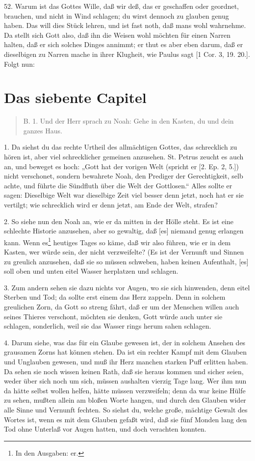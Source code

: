 52. Warum ist das Gottes Wille, daß wir deß, das er geschaffen oder geordnet, brauchen, und nicht in Wind schlagen; du wirst dennoch zu glauben genug haben. Das will dies Stück lehren, und ist fast noth, daß mans wohl wahrnehme. Da stellt sich Gott also, daß ihn die Weisen wohl möchten für einen Narren halten, daß er sich solches Dinges annimmt; er thut es aber eben darum, daß er dieselbigen zu Narren mache in ihrer Klugheit, wie Paulus sagt [1 Cor. 3, 19. 20.]. Folgt nun:

\section{Das siebente Capitel}

\begin{quote}
B. 1. Und der Herr sprach zu Noah: Gehe in den Kasten, du und dein ganzes Haus.
\end{quote}

1. Da siehst du das rechte Urtheil des allmächtigen Gottes, das schrecklich zu hören ist, aber viel schrecklicher gemeinen anzusehen. St. Petrus zeucht es auch an, und beweget es hoch: „Gott hat der vorigen Welt (spricht er [2. Ep. 2, 5.]) nicht verschonet, sondern bewahrete Noah, den Prediger der Gerechtigkeit, selb achte, und führte die Sündfluth über die Welt der Gottlosen.“ Alles sollte er sagen: Dieselbige Welt war dieselbige Zeit viel besser denn jetzt, noch hat er sie vertilgt; wie schrecklich wird er denn jetzt, am Ende der Welt, strafen?

2. So siehe nun den Noah an, wie er da mitten in der Hölle steht. Es ist eine schlechte Historie anzusehen, aber so gewaltig, daß [es] niemand genug erlangen kann. Wenn es\footnote{In den Ausgaben: er.} heutiges Tages so käme, daß wir also führen, wie er in dem Kasten, wer würde sein, der nicht verzweifelte? (Es ist der Vernunft und Sinnen zu greulich anzusehen, daß sie so müssen schweben, haben keinen Aufenthalt, [es] soll oben und unten eitel Wasser herplatzen und schlagen.

3. Zum andern sehen sie dazu nichts vor Augen, wo sie sich hinwenden, denn eitel Sterben und Tod; da sollte erst einem das Herz zappeln. Denn in solchem greulichen Zorn, da Gott so streng fährt, daß er um der Menschen willen auch seines Thieres verschont, möchten sie denken, Gott würde auch unter sie schlagen, sonderlich, weil sie das Wasser rings herum sahen schlagen.

4. Darum siehe, was das für ein Glaube gewesen ist, der in solchem Ansehen des grausamen Zorns hat können stehen. Da ist ein rechter Kampf mit dem Glauben und Unglauben gewesen, und muß ihr Herz manchen starken Puff erlitten haben. Da sehen sie noch wissen keinen Rath, daß sie heraus kommen und sicher seien, weder über sich noch um sich, müssen aushalten vierzig Tage lang. Wer ihm nun da hätte selbst wollen helfen, hätte müssen verzweifeln; denn da war keine Hülfe zu sehen, mußten allein am bloßen Worte hangen, und durch den Glauben wider alle Sinne und Vernunft fechten. So siehst du, welche große, mächtige Gewalt des Wortes ist, wenn es mit dem Glauben gefaßt wird, daß sie fünf Monden lang den Tod ohne Unterlaß vor Augen hatten, und doch verachten konnten.


